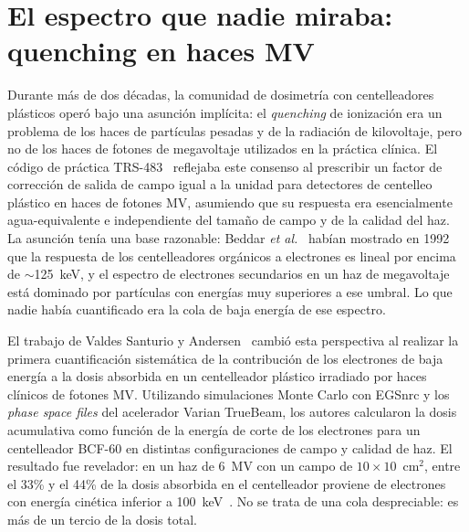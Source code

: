 \documentclass[11pt,a4paper]{article}
\begin{document}
\section{El espectro que nadie miraba: quenching en haces MV}



Durante más de dos décadas, la comunidad de dosimetría con centelleadores plásticos operó bajo una asunción implícita: el \textit{quenching} de ionización era un problema de los haces de partículas pesadas y de la radiación de kilovoltaje, pero no de los haces de fotones de megavoltaje utilizados en la práctica clínica. El código de práctica TRS-483~\cite{palmans2018} reflejaba este consenso al prescribir un factor de corrección de salida de campo igual a la unidad para detectores de centelleo plástico en haces de fotones MV, asumiendo que su respuesta era esencialmente agua-equivalente e independiente del tamaño de campo y de la calidad del haz. La asunción tenía una base razonable: Beddar \textit{et al.}~\cite{beddar1992} habían mostrado en 1992 que la respuesta de los centelleadores orgánicos a electrones es lineal por encima de $\sim$125~keV, y el espectro de electrones secundarios en un haz de megavoltaje está dominado por partículas con energías muy superiores a ese umbral. Lo que nadie había cuantificado era la cola de baja energía de ese espectro.

El trabajo de Valdes Santurio y Andersen~\cite{santurio2019} cambió esta perspectiva al realizar la primera cuantificación sistemática de la contribución de los electrones de baja energía a la dosis absorbida en un centelleador plástico irradiado por haces clínicos de fotones MV. Utilizando simulaciones Monte Carlo con EGSnrc y los \textit{phase space files} del acelerador Varian TrueBeam, los autores calcularon la dosis acumulativa como función de la energía de corte de los electrones para un centelleador BCF-60 en distintas configuraciones de campo y calidad de haz. El resultado fue revelador: en un haz de 6~MV con un campo de $10 \times 10$~cm$^{2}$, entre el 33\% y el 44\% de la dosis absorbida en el centelleador proviene de electrones con energía cinética inferior a 100~keV~\cite{santurio2019}. No se trata de una cola despreciable: es más de un tercio de la dosis total.
\end{document}
